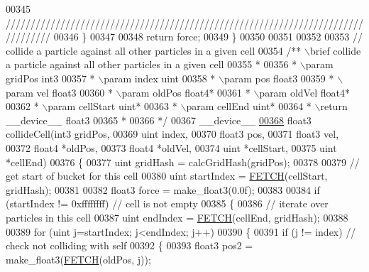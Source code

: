 \begin{DoxyCode}
00345 \textcolor{comment}{/////////////////////////////////////////////////////////////////////////////////}
00346     \}
00347 
00348     \textcolor{keywordflow}{return} force;
00349 \}
00350 
00351 
00352 
00353 \textcolor{comment}{// collide a particle against all other particles in a given cell}
00354 \textcolor{comment}{/** \(\backslash\)brief collide a particle against all other particles in a given cell}
00355 \textcolor{comment}{ *}
00356 \textcolor{comment}{ * \(\backslash\)param gridPos int3}
00357 \textcolor{comment}{ * \(\backslash\)param index uint}
00358 \textcolor{comment}{ * \(\backslash\)param pos float3}
00359 \textcolor{comment}{ * \(\backslash\)param vel float3}
00360 \textcolor{comment}{ * \(\backslash\)param oldPos float4*}
00361 \textcolor{comment}{ * \(\backslash\)param oldVel float4*}
00362 \textcolor{comment}{ * \(\backslash\)param cellStart uint*}
00363 \textcolor{comment}{ * \(\backslash\)param cellEnd uint*}
00364 \textcolor{comment}{ * \(\backslash\)return \_\_device\_\_ float3}
00365 \textcolor{comment}{ *}
00366 \textcolor{comment}{ */}
00367 \_\_device\_\_
\hypertarget{particles__kernel__impl_8cuh_source_l00368}{}\hyperlink{particles__kernel__impl_8cuh_a8e623e11d4ac873cfbe9d7c916326363}{00368} float3 collideCell(int3    gridPos,
00369                    uint    index,
00370                    float3  pos,
00371                    float3  vel,
00372                    float4 *oldPos,
00373                    float4 *oldVel,
00374                    uint   *cellStart,
00375                    uint   *cellEnd)
00376 \{
00377     uint gridHash = calcGridHash(gridPos);
00378 
00379     \textcolor{comment}{// get start of bucket for this cell}
00380     uint startIndex = \hyperlink{particles__kernel_8cuh_a12269d678a65f18889c2a7e98c756457}{FETCH}(cellStart, gridHash);
00381 
00382     float3 force = make\_float3(0.0f);
00383 
00384     \textcolor{keywordflow}{if} (startIndex != 0xffffffff)          \textcolor{comment}{// cell is not empty}
00385     \{
00386         \textcolor{comment}{// iterate over particles in this cell}
00387         uint endIndex = \hyperlink{particles__kernel_8cuh_a12269d678a65f18889c2a7e98c756457}{FETCH}(cellEnd, gridHash);
00388 
00389         \textcolor{keywordflow}{for} (uint j=startIndex; j<endIndex; j++)
00390         \{
00391             \textcolor{keywordflow}{if} (j != index)                \textcolor{comment}{// check not colliding with self}
00392             \{
00393                 float3 pos2 = make\_float3(\hyperlink{particles__kernel_8cuh_a12269d678a65f18889c2a7e98c756457}{FETCH}(oldPos, j));

\end{DoxyCode}
